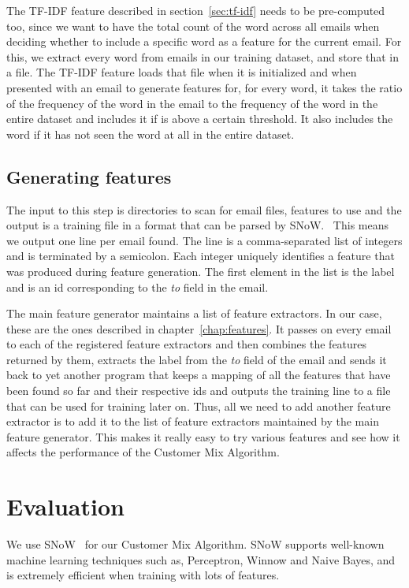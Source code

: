 \documentclass[senior,oneside]{UIUC}
\begin{document}
The TF-IDF feature described in section~\ref{sec:tf-idf} needs to be pre-computed too, since we want to have the total count of the word across all emails when deciding whether to include a specific word as a feature for the current email. For this, we extract every word from emails in our training dataset, and store that in a file. The TF-IDF feature loads that file when it is initialized and when presented with an email to generate features for, for every word, it takes the ratio of the frequency of the word in the email to the frequency of the word in the entire dataset and includes it if is above a certain threshold. It also includes the word if it has not seen the word at all in the entire dataset.

\section{Generating features}

The input to this step is directories to scan for email files, features to use and the output is a training file in a format that can be parsed by SNoW. \
This means we output one line per email found. The line is a comma-separated list of integers and is terminated by a semicolon. Each integer uniquely identifies a feature that was produced during feature generation. The first element in the list is the label and is an id corresponding to the \emph{to} field in the email. 

The main feature generator maintains a list of feature extractors. In our case, these are the ones described in chapter~\ref{chap:features}. It passes on every email to each of the registered feature extractors and then combines the features returned by them, extracts the label from the \emph{to} field of the email and sends it back to yet another program that keeps a mapping of all the features that have been found so far and their respective ids and outputs the training line to a file that can be used for training later on. Thus, all we need to add another feature extractor is to add it to the list of feature extractors maintained by the main feature generator. This makes it really easy to try various features and see how it affects the performance of the Customer Mix Algorithm.

\chapter{Evaluation}
\label{chap:evaluation}

We use SNoW~\cite{snow} for our Customer Mix Algorithm. SNoW supports well-known machine learning techniques such as, Perceptron, Winnow and Naive Bayes, and is extremely efficient when training with lots of features.
\end{document}
